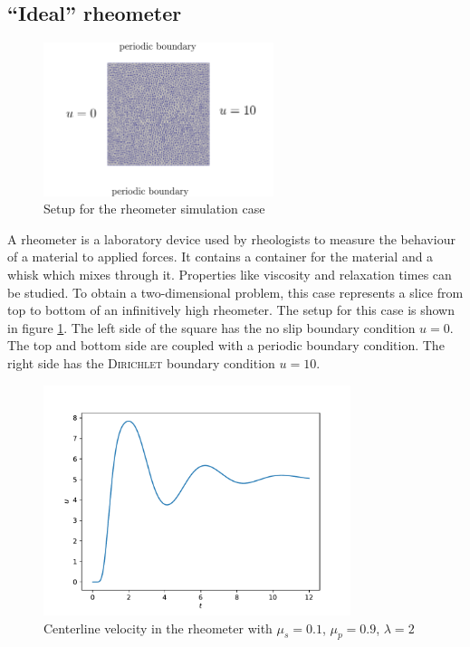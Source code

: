 \documentclass[12pt,a4paper,twoside, open=right]{scrreprt}
\theoremstyle{definition}
\theoremstyle{plain}
\begin{document}
\subsection{\enquote{Ideal} rheometer}
\begin{figure}
    \centering
    \includegraphics[width=0.6\textwidth]{setuprheo}
    \caption{Setup for the rheometer simulation case}
    \label{fig:rheometersetup}
\end{figure}
A rheometer is a laboratory device used by rheologists to measure the behaviour of a material to applied forces. It contains a container for the material and a whisk which mixes through it. Properties like viscosity and relaxation times can be studied.
To obtain a two-dimensional problem, this case represents a slice from top to bottom of an infinitively high rheometer.
The setup for this case is shown in figure \ref{fig:rheometersetup}. The left side of the square has the no slip boundary condition $u=0$. The top and bottom side are coupled with a periodic boundary condition. The right side has the \textsc{Dirichlet} boundary condition $u=10$. 
\begin{figure}
    \centering
    \includegraphics[width=0.8\textwidth]{RheometerCenterline}
    \caption{Centerline velocity in the rheometer with $\mu_s=0.1$, $\mu_p=0.9$, $\lambda=2$ }
    \label{fig:rheomcenter}
\end{figure} 
\end{document}
